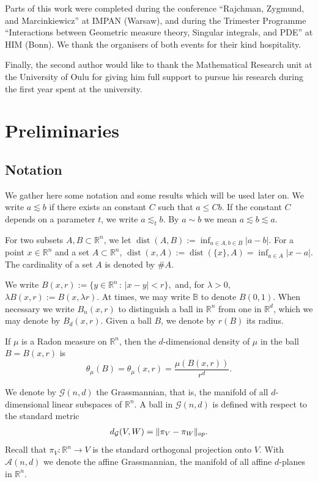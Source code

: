 \documentclass[11pt,reqno]{amsart}
\def\dA{{\mathcal{A}}}
\def\dG{{\mathcal{G}}}
\def\dist{\mathop\mathrm{dist}} 						%
\newcommand{\fr}[2]{\frac{#1}{#2}}
\theoremstyle{definition}
\theoremstyle{remark}
\numberwithin{equation}{section}
\newcommand{\R}{\mathbb{R}}
\newcommand{\B}{\mathbb{B}}
\theoremstyle{theorem}
\theoremstyle{definition}
\theoremstyle{remark}
\numberwithin{equation}{section}
\begin{document}
	Parts of this work were completed during the conference ``Rajchman, Zygmund, and Marcinkiewicz'' at IMPAN (Warsaw), and during the Trimester Programme ``Interactions between Geometric measure theory, Singular integrals, and PDE'' at HIM (Bonn). We thank the organisers of both events for their kind hospitality.
	
	Finally, the second author would like to thank the Mathematical Research unit at the University of Oulu for giving him full support to pursue his research during the first year spent at the university. 

	\section{Preliminaries}\label{sec:prels}
	\subsection{Notation} \label{sec:notation}
	We gather here some notation and some results which will be used later on.
	We write $a \lesssim b$ if there exists an constant $C$ such that $a \leq Cb$. If the constant $C$ depends on a parameter $t$, we write $a\lesssim_t b$. By $a \sim b$ we mean $a \lesssim b \lesssim a$. 
	
	
	For two subsets $A,B \subset \R^n$, we let
	$
	\dist(A,B) := \inf_{a\in A, b \in B} |a-b|.
	$
	For a point $x \in \R^n$ and a set $A \subset \R^n$, 
	$
	\dist(x, A):= \dist(\{x\}, A)= \inf_{a\in A} |x-a|.
	$
	The cardinality of a set $A$ is denoted by $\#A$.
	
	We write 
	$
	B(x, r) := \{y \in \R^n \, :\,|x-y|<r\},
	$
	and, for $\lambda >0$,
	$
	\lambda B(x,r):= B(x, \lambda r).
	$
	At times, we may write $\B$ to denote $B(0,1)$. When necessary we write $B_n(x,r)$ to distinguish a ball in $\R^n$ from one in $\R^d$, which we may denote by $B_d(x, r)$. Given a ball $B$, we denote by $r(B)$ its radius. 
	
	If $\mu$ is a Radon measure on $\R^n$, then the $d$-dimensional density of $\mu$ in the ball $B=B(x,r)$ is
	\begin{equation*}
	\theta_\mu(B)=\theta_\mu(x,r)=\fr{\mu(B(x,r))}{r^d}.
	\end{equation*}
	
	We denote by $\dG(n,d)$ the Grassmannian, that is, the manifold of all $d$-dimensional linear subspaces of $\R^n$. A ball in $\dG(n,d)$ is defined with respect to the standard metric
	\begin{align*}
	d_{\dG}(V, W) = \|\pi_V - \pi_W\|_{{\rm op}}.
	\end{align*}
	Recall that $\pi_V: \R^n \to V$ is the standard orthogonal projection onto $V$.
	With $\dA(n,d)$ we denote the affine Grassmannian, the manifold of all affine $d$-planes in $\R^n$.
	
\end{document}
